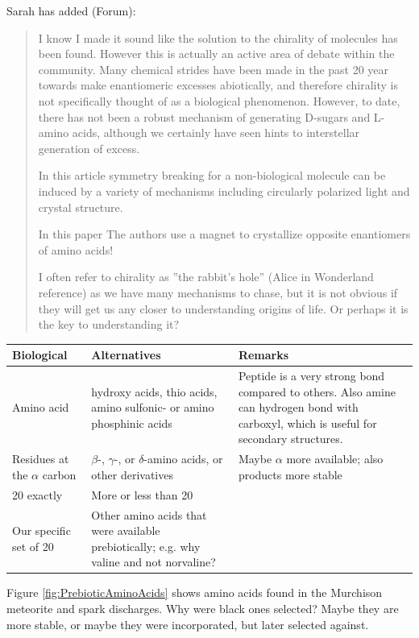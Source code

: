 \documentclass[]{article}
\begin{document}
Sarah has added (Forum):
\begin{quotation}
	I know I made it sound like the solution to the chirality of molecules has been found. However this is actually an active area of debate within the community. Many chemical strides have been made in the past 20 year towards make enantiomeric excesses abiotically, and therefore chirality is not specifically thought of as a biological phenomenon. However, to date, there has not been a robust mechanism of generating D-sugars and L-amino acids, although we certainly have seen hints to interstellar generation of excess.
	
	In this article \cite{soai2019role} symmetry breaking for a non-biological molecule can be induced by a variety of mechanisms including circularly polarized light and crystal structure.
	
	In this paper\cite{tassinari2019enantioseparation} The authors use a magnet to crystallize opposite enantiomers of amino acids!
	
	I often refer to chirality as ''the rabbit's hole'' (Alice in Wonderland reference) as we have many mechanisms to chase, but it is not obvious if they will get us any closer to understanding origins of life. Or perhaps it is the key to understanding it?
\end{quotation}
\newlength\mylength
\setlength{}
\begin{tabular}{|p{\mylength}| p{\mylength}|p{\mylength}| } \hline
	Biological& Alternatives&Remarks\\ \hline
	Amino acid&	hydroxy acids, thio acids, amino sulfonic- or amino phosphinic acids&Peptide is a very strong bond compared to others. Also amine can hydrogen bond with carboxyl, which is useful for secondary structures. \\ \hline
	Residues at the $\alpha$ carbon& $\beta$-, $\gamma$-, or $\delta$-amino acids, or other derivatives&Maybe $\alpha$ more available; also products more stable\\ \hline
	20 exactly& More or less than 20&\\ \hline
	Our specific set of 20 &Other amino acids that were available prebiotically; e.g. why valine and not norvaline?&\\ \hline
\end{tabular}


Figure \ref{fig:PrebioticAminoAcids} \cite{cleaves2010origin} shows amino acids found in the Murchison meteorite and spark discharges. Why were black ones selected? Maybe they are more stable, or maybe they were incorporated, but later selected against.
\end{document}
